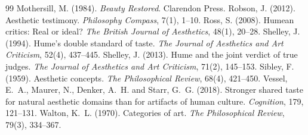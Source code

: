 \documentclass{situationist-preprint}
\begin{document}
\begin{thebibliography}{99}
 Mothersill, M. (1984). \emph{Beauty Restored}. Clarendon Press.
 Robson, J. (2012). Aesthetic testimony. \emph{Philosophy Compass}, 7(1), 1--10.
 Ross, S. (2008). Humean critics: Real or ideal? \emph{The British Journal of Aesthetics}, 48(1), 20--28.
 Shelley, J. (1994). Hume's double standard of taste. \emph{The Journal of Aesthetics and Art Criticism}, 52(4), 437--445.
 Shelley, J. (2013). Hume and the joint verdict of true judges. \emph{The Journal of Aesthetics and Art Criticism}, 71(2), 145--153.
 Sibley, F. (1959). Aesthetic concepts. \emph{The Philosophical Review}, 68(4), 421--450.
 Vessel, E.~A., Maurer, N., Denker, A.~H. and Starr, G.~G. (2018). Stronger shared taste for natural aesthetic domains than for artifacts of human culture. \emph{Cognition}, 179, 121--131.
 Walton, K.~L. (1970). Categories of art. \emph{The Philosophical Review}, 79(3), 334--367.
\end{thebibliography}
\end{document}
